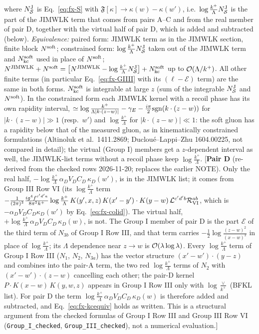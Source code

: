 {where $N^{\rm J}_{\mathcal{S}}$ is Eq.~\eqref{eq:fx-S} with $\mathfrak{F}[\kappa]\to\kappa(w)-\kappa(w')$, i.e.\ $\log\frac{k^{+}}{\Lambda}N^{\rm J}_{\mathcal{S}}$ is the part of the JIMWLK term that comes from pairs A--C and from the real member of pair D, together with the virtual half of pair D, which is added and subtracted (below). \emph{Equivalence:} paired form: JIMWLK term as in the JIMWLK section, finite block $N^{\rm soft}$; constrained form: $\log\frac{k^{+}}{\Lambda}N^{\rm J}_{\mathcal{S}}$ taken out of the JIMWLK term and $N^{\rm soft}_{\rm kc}$ used in place of $N^{\rm soft}$; $N^{\rm JIMWLK}+N^{\rm soft}=\big[N^{\rm JIMWLK}-\log\frac{k^{+}}{\Lambda}N^{\rm J}_{\mathcal{S}}\big]+N^{\rm soft}_{\rm kc}$ up to ${\cal O}(\Lambda/k^{+})$. All other finite terms (in particular Eq.~\eqref{eq:fx-GIIII} with its $(\ell-\mathcal{E})$ term) are the same in both forms. $N^{\rm soft}_{\rm kc}$ is integrable at large $z$ (sum of the integrable $N^{\rm J}_{\mathcal{S}}$ and $N^{\rm soft}$). In the constrained form each JIMWLK kernel with a recoil phase has its own rapidity interval, $\simeq\log\frac{k^{+}}{\Lambda|k\cdot(z-w)|}-\gamma_{E}-\frac{i\pi}{2}{\rm sgn}(k\cdot(z-w))$ for $|k\cdot(z-w)|\gg1$ (resp.\ $w'$) and $\log\frac{k^{+}}{\Lambda}$ for $|k\cdot(z-w)|\ll1$: the soft gluon has a rapidity below that of the measured gluon, as in kinematically constrained formulations (Altinoluk et al.\ 1411.2869; Ducloué--Lappi--Zhu 1604.00225, not compared in detail); the virtual (Group I) members get a $z$-dependent interval as well, the JIMWLK-list terms without a recoil phase keep $\log\frac{k^{+}}{\Lambda}$. [\textbf{Pair D} (re-derived from the checked rows 2026-11-20; replaces the earlier NOTE). Only the real half, $-\log\frac{k^{+}}{\Lambda}\,\alpha_{D}V_{D}C_{D}\,\kappa_{D}(w')$, is in the JIMWLK list; it comes from Group III Row VI (its $\log\frac{k^{+}}{\Lambda}$ term $-\frac{1}{(2\pi)^{3}}\frac{ig^{4}f^{c'd'a}}{8\pi^{5}k^{+}}\log\frac{k^{+}}{\Lambda}\,K(y',x,z)\,K(x'-y')\cdot K(y-w)\,\mathcal{L}^{c'd'b}\mathcal{R}_{\rm VI}^{ab}$, which is $-\alpha_{D}V_{D}C_{D}\kappa_{D}(w')$ by Eq.~\eqref{eq:fx-colid}). The virtual half, $+\log\frac{k^{+}}{\Lambda}\,\alpha_{D}V_{D}C_{D}\,\kappa_{D}(w)$, is not. The Group I member of pair D is the part $\mathcal{E}$ of the third term of $N_{3b}$ of Group I Row III, and that term carries $-\frac12\log\frac{(z-w)^{2}}{(x-w)^{2}}$ in place of $\log\frac{k^{+}}{\Lambda}$; its $\Lambda$ dependence near $z\to w$ is ${\cal O}(\lambda\log\lambda)$. Every $\log\frac{k^{+}}{\Lambda}$ term of Group I Row III ($N_{1}$, $N_{2}$, $N_{3a}$) has the vector structure $(x'-w')\cdot(y-z)$ and combines into the pair-A term, the two red $\log\frac{k^{+}}{\Lambda}$ terms of $N_{2}$ with $(x'-w')\cdot(z-w)$ cancelling each other; the pair-D kernel $P\cdot K(x-w)\,K(y,w,z)$ appears in Group I Row III only with $\log\frac{\vee}{k^{+}}$ (BFKL list). For pair D the term $\log\frac{k^{+}}{\Lambda}\,\alpha_{D}V_{D}C_{D}\,\kappa_{D}(w)$ is therefore added and subtracted, and Eq.~\eqref{eq:fx-kcequiv} holds as written. This is a structural argument from the checked formulas of Group I Row III and Group III Row VI (\texttt{Group\_I\_checked}, \texttt{Group\_III\_checked}), not a numerical evaluation.]

}
